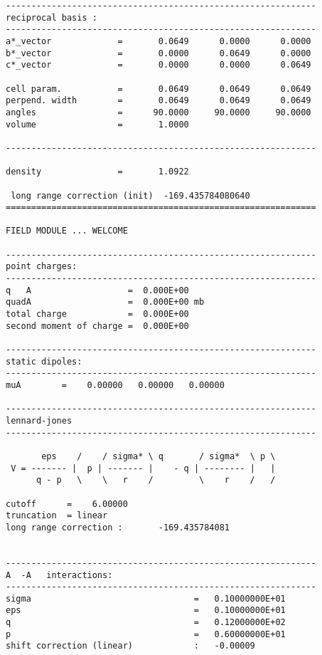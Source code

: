 \documentclass[a4paper]{article}
\begin{document}
\begin{verbatim}
-------------------------------------------------------------
reciprocal basis : 
-------------------------------------------------------------
a*_vector             =       0.0649      0.0000      0.0000
b*_vector             =       0.0000      0.0649      0.0000
c*_vector             =       0.0000      0.0000      0.0649

cell param.           =       0.0649      0.0649      0.0649
perpend. width        =       0.0649      0.0649      0.0649
angles                =      90.0000     90.0000     90.0000
volume                =       1.0000

-------------------------------------------------------------

density               =       1.0922

 long range correction (init)  -169.435784080640     
=============================================================

FIELD MODULE ... WELCOME

-------------------------------------------------------------
point charges: 
-------------------------------------------------------------
q   A                   =  0.000E+00
quadA                   =  0.000E+00 mb
total charge            =  0.000E+00
second moment of charge =  0.000E+00

-------------------------------------------------------------
static dipoles: 
-------------------------------------------------------------
muA        =    0.00000   0.00000   0.00000

-------------------------------------------------------------
lennard-jones           
-------------------------------------------------------------

       eps    /    / sigma* \ q       / sigma*  \ p \
 V = ------- |  p | ------- |    - q | -------- |   |
      q - p   \    \   r    /         \    r    /   /

cutoff      =    6.00000
truncation  = linear                                                      
long range correction :       -169.435784081


-------------------------------------------------------------
A  -A   interactions:
-------------------------------------------------------------
sigma                                =   0.10000000E+01
eps                                  =   0.10000000E+01
q                                    =   0.12000000E+02
p                                    =   0.60000000E+01
shift correction (linear)            :   -0.00009



\end{verbatim}
\end{document}

